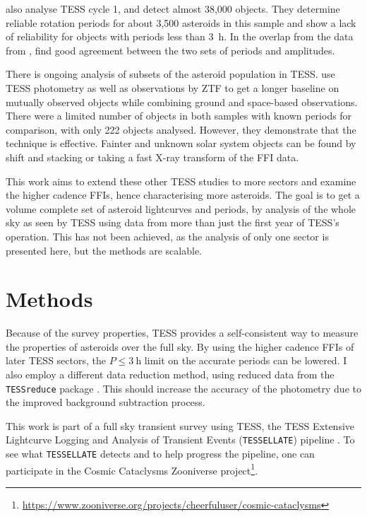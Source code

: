 \documentclass{UCreport}
\begin{document}
\citet{McNeill2023} also analyse TESS cycle 1, and detect almost 38,000 objects.
They determine reliable rotation periods for about 3,500 asteroids in this sample and show a lack of reliability for objects with periods less than \qty{3}{\hour}.
In the overlap from the data from \citet{Pal2020}, \citeauthor{McNeill2023} find good agreement between the two sets of periods and amplitudes.

There is ongoing analysis of subsets of the asteroid population in TESS.
\citet{Gowanlock2024} use TESS photometry as well as  observations by ZTF to get a longer baseline on mutually observed objects while combining ground and space-based observations.
There were a limited number of objects in both samples with known periods for comparison, with only 222 objects analysed. However, they demonstrate that the technique is effective.
Fainter and unknown solar system objects can be found by shift and stacking \citep{Holman2019, Payne2019,Rice2020} or taking a fast X-ray transform \citep{Nguyen2024} of the FFI data. 

This work aims to extend these other TESS studies to more sectors and examine the higher cadence FFIs, hence characterising more asteroids.
The goal is to get a volume complete set of asteroid lightcurves and periods, by analysis of the whole sky as seen by TESS using data from more than just the first year of TESS's operation.
This has not been achieved, as the analysis of only one sector is presented here, but the methods are scalable.

\section{Methods}\label{Sec:Meth}

Because of the survey properties, TESS provides a self-consistent way to measure the properties of asteroids over the full sky.
By using the higher cadence FFIs of later TESS sectors, the $P\leq\qty{3}{\hour}$ limit on the accurate periods \citep[as found by ][]{McNeill2023} can be lowered.
I also employ a different data reduction method, using reduced data from the \texttt{TESSreduce} package \citep{Ridden-Harper2021}.
This should increase the accuracy of the photometry due to the improved background subtraction process.

This work is part of a full sky transient survey using TESS, the TESS Extensive Lightcurve Logging and Analysis of Transient Events (\texttt{TESSELLATE}) pipeline \citep{TESSELLATE}.
To see what \texttt{TESSELLATE} detects and to help progress the pipeline, one can participate in the Cosmic Cataclysms Zooniverse project\footnote{\href{https://www.zooniverse.org/projects/cheerfuluser/cosmic-cataclysms}{https://www.zooniverse.org/projects/cheerfuluser/cosmic-cataclysms}}.
\end{document}

